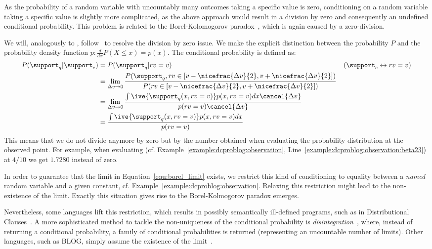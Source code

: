 As the probability of a random variable with uncountably many outcomes taking a specific value is zero, conditioning on a random variable taking a specific value is slightly more complicated, as the above approach would result in  a division by zero and consequently an undefined conditional probability. 
This problem is related to the Borel-Kolomogorov paradox~\citep{kolmogorov1950foundations,gyenis2017conditioning}, which is again caused by a zero-division.

We will, analogously to \citet{nitti2016probabilistic},   follow~\citet{kadane2011principles} to resolve the division by zero issue.
We make the explicit distinction between the probability $P$ and the probability density function $p:\frac{d}{dx}P(X \leq x)=p(x)$. The conditional probability is defined as:
\begin{align}
	P(\support_q| \support_e)
	&=P(\support_q|rv=v) & (\support_e \leftrightarrow rv=v )\\
	&=\lim_{\Delta v\rightarrow 0} \frac{P(\support_q,rv \in [v-\nicefrac{\Delta v}{2},v+\nicefrac{\Delta v}{2}])}{ P(rv \in [v-\nicefrac{\Delta v}{2},v+\nicefrac{\Delta v}{2}])} \label{equ:borel_limit} \\
	&=\lim_{\Delta v\rightarrow 0} \frac{\int \ive{ \support_q(x,rv=v)} p(x,rv=v)dx \cancel{\Delta v}}{p(rv=v)\cancel{\Delta v}} \\
	&=\frac{\int \ive{ \support_q(x, rv=v)} p(x,rv=v)dx}{p(rv=v)}
\end{align}
This means that we do not divide anymore by zero but by the number obtained when evaluating the probability distribution at the observed point. For example, when evaluating  (cf. Example~\ref{example:dcproblog:observation}, Line~\ref{example:dcproblog:observation:beta23}) at $4/10$  we get $1.7280$ instead of zero.

In order to guarantee that the limit in Equation~\ref{equ:borel_limit} exists, we restrict this kind of conditioning to equality between a {\em named} random variable and a given constant, cf. Example~\ref{example:dcproblog:observation}.
Relaxing this restriction might lead to the non-existence of the limit. Exactly this situation gives rise to the Borel-Kolmogorov paradox emerges. 

Nevertheless, some languages lift this restriction, which results in possibly semantically ill-defined programs, such as in Distributional Clauses~\citep[Section 3.2]{nitti2016probabilistic}. A more sophisticated method to tackle the non-uniqueness of the conditional probability is {\em disintegration}~\citep{shan2017exact}, where, instead of returning a conditional probability, a family of conditional probabilities is returned (representing an uncountable number of limits). Other languages, such as BLOG, simply assume the existence of the limit~\citep{wu2018discrete}.

